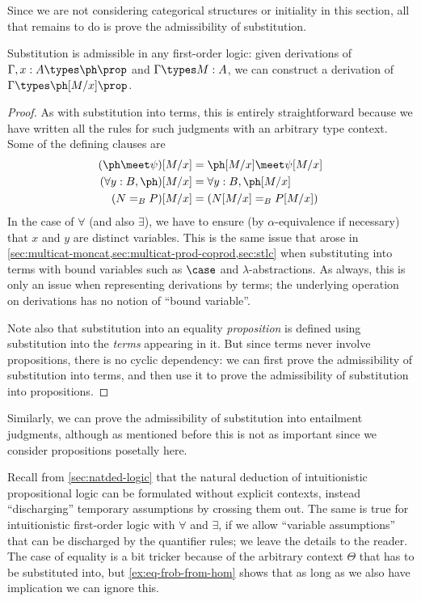 Since we are not considering categorical structures or initiality in this section, all that remains to do is prove the admissibility of substitution.

\begin{thm}\label{thm:fol-subprop-adm}
  Substitution is admissible in any first-order logic: given derivations of $\Gamma,x:A \types \ph\prop$ and $\Gamma\types M:A$, we can construct a derivation of $\Gamma \types \ph[M/x]\prop$.
\end{thm}
\begin{proof}
  As with substitution into terms, this is entirely straightforward because we have written all the rules for such judgments with an arbitrary type context.
  Some of the defining clauses are
  \begin{align*}
    (\ph\meet\psi)[M/x] &= \ph[M/x] \meet \psi[M/x]\\
    (\forall y:B,\ph)[M/x] &= \forall y:B,\ph[M/x]\\
    (N=_B P)[M/x] &= (N[M/x] =_B P[M/x])
  \end{align*}
  In the case of $\forall$ (and also $\exists$), we have to ensure (by $\alpha$-equivalence if necessary) that $x$ and $y$ are distinct variables.
  This is the same issue that arose in \cref{sec:multicat-moncat,sec:multicat-prod-coprod,sec:stlc} when substituting into terms with bound variables such as $\case$ and $\lambda$-abstractions.
  As always, this is only an issue when representing derivations by terms; the underlying operation on derivations has no notion of ``bound variable''.

  Note also that substitution into an equality \emph{proposition} is defined using substitution into the \emph{terms} appearing in it.
  But since terms never involve propositions, there is no cyclic dependency: we can first prove the admissibility of substitution into terms, and then use it to prove the admissibility of substitution into propositions.
\end{proof}

Similarly, we can prove the admissibility of substitution into entailment judgments, although as mentioned before this is not as important since we consider propositions posetally here.

\begin{rmk}
  Recall from \cref{sec:natded-logic} that the natural deduction of intuitionistic propositional logic can be formulated without explicit contexts, instead ``discharging'' temporary assumptions by crossing them out.
  The same is true for intuitionistic first-order logic with $\forall$ and $\exists$, if we allow ``variable assumptions'' that can be discharged by the quantifier rules; we leave the details to the reader.
  The case of equality is a bit tricker because of the arbitrary context $\Theta$ that has to be substituted into, but \cref{ex:eq-frob-from-hom} shows that as long as we also have implication we can ignore this.
\end{rmk}

